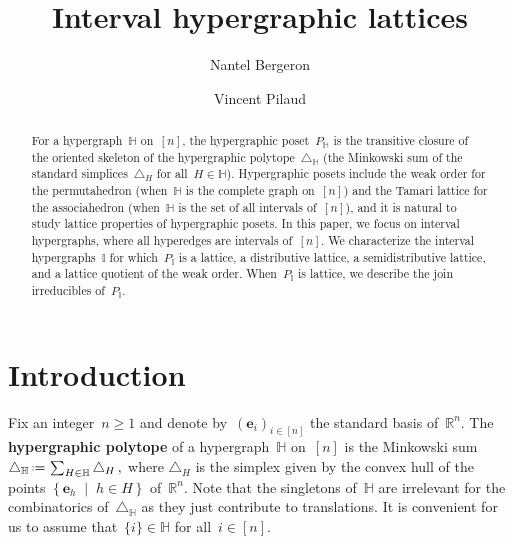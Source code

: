 \documentclass[reqno]{amsart}
\title{Interval hypergraphic lattices}
\author[N.~Bergeron]{Nantel Bergeron}
\author{Vincent Pilaud}
\theoremstyle{definition}
\newcommand{\R}{\mathbb{R}} %
\renewcommand{\b}[1]{\boldsymbol{#1}} %
\newcommand{\set}[2]{\left\{ #1 \;\middle|\; #2 \right\}} %
\newcommand{\eqdef}{\mbox{\,\raisebox{0.2ex}{\scriptsize\ensuremath{\mathrm:}}\ensuremath{=}\,}} %
\newcommand{\simplex}{\triangle} %
\newcommand{\defn}[1]{\textbf{\textsf{\color{PineGreen} #1}}} %
\newcommand{\HH}{\mathbb H}  %
\newcommand{\II}{\mathbb I} %
\begin{document}
\begin{abstract}
For a hypergraph~$\HH$ on~$[n]$, the hypergraphic poset~$P_\HH$ is the transitive closure of the oriented skeleton of the hypergraphic polytope~$\simplex_\HH$ (the Minkowski sum of the standard simplices~$\simplex_H$ for all~$H \in \HH$).
Hypergraphic posets include the weak order for the permutahedron (when~$\HH$ is the complete graph on~$[n]$) and the Tamari lattice for the associahedron (when~$\HH$ is the set of all intervals of~$[n]$), and it is natural to study lattice properties of hypergraphic posets.
In this paper, we focus on interval hypergraphs, where all hyperedges are intervals of~$[n]$.
We characterize the interval hypergraphs~$\II$ for which~$P_\II$ is a lattice, a distributive lattice, a semidistributive lattice, and a lattice quotient of the weak order.
When~$P_\II$ is lattice, we describe the join irreducibles of~$P_\II$.
\end{abstract}

\maketitle

\tableofcontents


\section{Introduction}
\label{sec:introduction}

Fix an integer~$n \ge 1$ and denote by~$(\b{e}_i)_{i \in [n]}$ the standard basis of~$\R^n$.
The \defn{hypergraphic polytope} of a hypergraph~$\HH$ on~$[n]$ is the Minkowski sum
\(
\simplex_\HH \eqdef \sum_{H\in \HH} \simplex_H\,,
\)
where $\simplex_H$ is the simplex given by the convex hull of the points $\set{\b{e}_h}{h \in H}$ of~$\R^n$.
Note that the singletons of~$\HH$ are irrelevant for the combinatorics of~$\triangle_\HH$ as they just contribute to translations.
It is convenient for us to assume that~$\{i\} \in \HH$ for all~$i \in [n]$.
\end{document}
